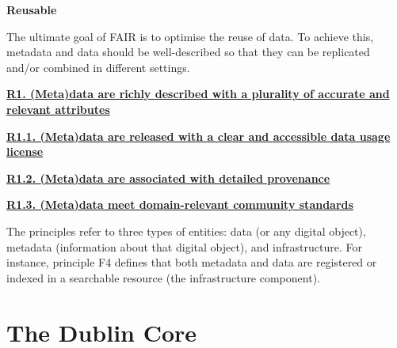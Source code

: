 \documentclass[
  a4paper,
  openany, a4paper, oneside]{book}
\begin{document}
\textbf{{R}eusable}

The ultimate goal of FAIR is to optimise the reuse of data. To achieve this, metadata and data should be well-described so that they can be replicated and/or combined in different settings.

\textbf{\href{https://www.go-fair.org/fair-principles/r1-metadata-richly-described-plurality-accurate-relevant-attributes/}{R1. (Meta)data are richly described with a plurality of accurate and relevant attributes}}

\textbf{\href{https://www.go-fair.org/fair-principles/r1-1-metadata-released-clear-accessible-data-usage-license/}{R1.1. (Meta)data are released with a clear and accessible data usage license}}

\textbf{\href{https://www.go-fair.org/fair-principles/r1-2-metadata-associated-detailed-provenance/}{R1.2. (Meta)data are associated with detailed provenance}}

\textbf{\href{https://www.go-fair.org/fair-principles/r1-3-metadata-meet-domain-relevant-community-standards/}{R1.3. (Meta)data meet domain-relevant community standards}}

The principles refer to three types of entities: data (or any digital object), metadata (information about that digital object), and infrastructure. For instance, principle F4 defines that both metadata and data are registered or indexed in a searchable resource (the infrastructure component).

\hypertarget{Dublin-Core}{%
\section{The Dublin Core}\label{Dublin-Core}}
\end{document}
